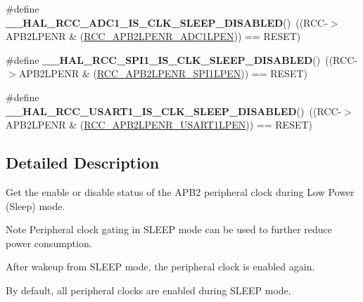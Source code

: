 \begin{DoxyCompactItemize}
\item 
\hypertarget{group___r_c_c___a_p_b2___clock___sleep___enable___disable___status_ga5b3baade56bc0603ac5b3ae3bf3b7da9}{\#define {\bfseries \-\_\-\-\_\-\-H\-A\-L\-\_\-\-R\-C\-C\-\_\-\-A\-D\-C1\-\_\-\-I\-S\-\_\-\-C\-L\-K\-\_\-\-S\-L\-E\-E\-P\-\_\-\-D\-I\-S\-A\-B\-L\-E\-D}()~((R\-C\-C-\/$>$A\-P\-B2\-L\-P\-E\-N\-R \& (\hyperlink{group___peripheral___registers___bits___definition_ga126a8791f77cecc599e32d2c882a4dab}{R\-C\-C\-\_\-\-A\-P\-B2\-L\-P\-E\-N\-R\-\_\-\-A\-D\-C1\-L\-P\-E\-N})) == R\-E\-S\-E\-T)}\label{group___r_c_c___a_p_b2___clock___sleep___enable___disable___status_ga5b3baade56bc0603ac5b3ae3bf3b7da9}

\item 
\hypertarget{group___r_c_c___a_p_b2___clock___sleep___enable___disable___status_gab9a82b96c7950398956ee6f58c3d5dda}{\#define {\bfseries \-\_\-\-\_\-\-H\-A\-L\-\_\-\-R\-C\-C\-\_\-\-S\-P\-I1\-\_\-\-I\-S\-\_\-\-C\-L\-K\-\_\-\-S\-L\-E\-E\-P\-\_\-\-D\-I\-S\-A\-B\-L\-E\-D}()~((R\-C\-C-\/$>$A\-P\-B2\-L\-P\-E\-N\-R \& (\hyperlink{group___peripheral___registers___bits___definition_ga2c6729058e54f4b8f8ae01d5b3586aaa}{R\-C\-C\-\_\-\-A\-P\-B2\-L\-P\-E\-N\-R\-\_\-\-S\-P\-I1\-L\-P\-E\-N})) == R\-E\-S\-E\-T)}\label{group___r_c_c___a_p_b2___clock___sleep___enable___disable___status_gab9a82b96c7950398956ee6f58c3d5dda}

\item 
\hypertarget{group___r_c_c___a_p_b2___clock___sleep___enable___disable___status_ga2123ed8a27c8cf060899c1e7a923b8c8}{\#define {\bfseries \-\_\-\-\_\-\-H\-A\-L\-\_\-\-R\-C\-C\-\_\-\-U\-S\-A\-R\-T1\-\_\-\-I\-S\-\_\-\-C\-L\-K\-\_\-\-S\-L\-E\-E\-P\-\_\-\-D\-I\-S\-A\-B\-L\-E\-D}()~((R\-C\-C-\/$>$A\-P\-B2\-L\-P\-E\-N\-R \& (\hyperlink{group___peripheral___registers___bits___definition_gab8b429bc8d52abd1ba3818a82542bb98}{R\-C\-C\-\_\-\-A\-P\-B2\-L\-P\-E\-N\-R\-\_\-\-U\-S\-A\-R\-T1\-L\-P\-E\-N})) == R\-E\-S\-E\-T)}\label{group___r_c_c___a_p_b2___clock___sleep___enable___disable___status_ga2123ed8a27c8cf060899c1e7a923b8c8}

\end{DoxyCompactItemize}


\subsection{Detailed Description}
Get the enable or disable status of the A\-P\-B2 peripheral clock during Low Power (Sleep) mode. \begin{DoxyNote}{Note}
Peripheral clock gating in S\-L\-E\-E\-P mode can be used to further reduce power consumption. 

After wakeup from S\-L\-E\-E\-P mode, the peripheral clock is enabled again. 

By default, all peripheral clocks are enabled during S\-L\-E\-E\-P mode. 
\end{DoxyNote}
